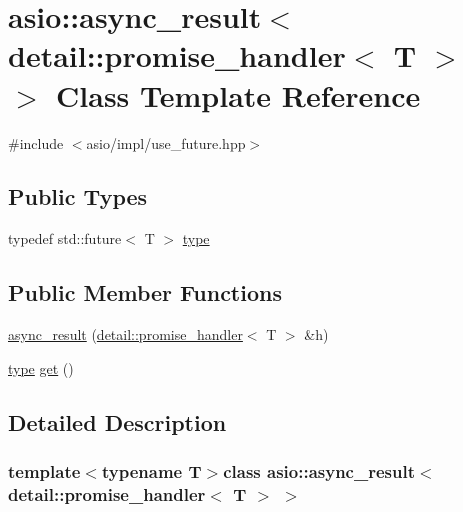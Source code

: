 \hypertarget{classasio_1_1async__result_3_01detail_1_1promise__handler_3_01_t_01_4_01_4}{}\section{asio\+:\+:async\+\_\+result$<$ detail\+:\+:promise\+\_\+handler$<$ T $>$ $>$ Class Template Reference}
\label{classasio_1_1async__result_3_01detail_1_1promise__handler_3_01_t_01_4_01_4}


{\ttfamily \#include $<$asio/impl/use\+\_\+future.\+hpp$>$}

\subsection*{Public Types}
\begin{DoxyCompactItemize}
\item 
typedef std\+::future$<$ T $>$ \hyperlink{classasio_1_1async__result_3_01detail_1_1promise__handler_3_01_t_01_4_01_4_ae101840b0887943caf834bde0f343797}{type}
\end{DoxyCompactItemize}
\subsection*{Public Member Functions}
\begin{DoxyCompactItemize}
\item 
\hyperlink{classasio_1_1async__result_3_01detail_1_1promise__handler_3_01_t_01_4_01_4_aef00dd7e5af6e04440c2e23e6a05f5e4}{async\+\_\+result} (\hyperlink{classasio_1_1detail_1_1promise__handler}{detail\+::promise\+\_\+handler}$<$ T $>$ \&h)
\item 
\hyperlink{classasio_1_1async__result_3_01detail_1_1promise__handler_3_01_t_01_4_01_4_ae101840b0887943caf834bde0f343797}{type} \hyperlink{classasio_1_1async__result_3_01detail_1_1promise__handler_3_01_t_01_4_01_4_af67bc306c6eae718269250d6b5172d71}{get} ()
\end{DoxyCompactItemize}


\subsection{Detailed Description}
\subsubsection*{template$<$typename T$>$class asio\+::async\+\_\+result$<$ detail\+::promise\+\_\+handler$<$ T $>$ $>$}



